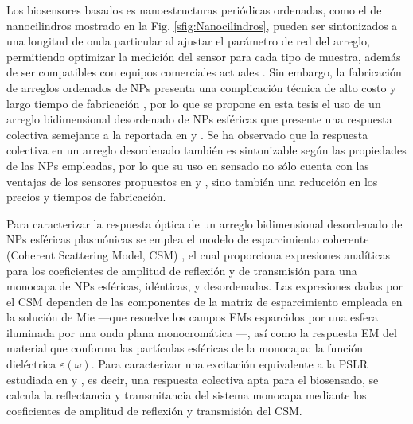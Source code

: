 Los biosensores basados es nanoestructuras periódicas ordenadas, como el de nanocilindros mostrado en la Fig. \ref{sfig:Nanocilindros}, pueden ser sintonizados a una longitud de onda particular al ajustar el parámetro de red del arreglo, permitiendo optimizar la medición del sensor para cada tipo de muestra, además de ser compatibles con equipos comerciales actuales \cite{kabashin2009plasmonic}.  Sin embargo, la fabricaci\'on de arreglos ordenados de NPs presenta una complicaci\'on t\'ecnica de alto costo y largo tiempo de fabricación \cite{estevez2014trends}, por lo que se propone en esta tesis el uso de un arreglo bidimensional desordenado de NPs esféricas que presente una respuesta colectiva semejante a la reportada en \cite{kabashin2009plasmonic} y \cite{danilov2018ultra}. Se ha observado que la respuesta colectiva en un arreglo desordenado también es sintonizable según las propiedades de las NPs empleadas, por lo que su uso en sensado no sólo cuenta con las ventajas de los sensores propuestos en \cite{kabashin2009plasmonic} y \cite{danilov2018ultra}, sino también una reducción en los precios y tiempos de fabricación. 

Para  caracterizar la respuesta óptica de un arreglo bidimensional desordenado de NPs esféricas plasmónicas se emplea el modelo de esparcimiento coherente (Coherent Scattering Model, CSM) \cite{reyes2018analytical}, el cual proporciona expresiones analíticas para los coeficientes de amplitud de reflexión y de transmisión para una monocapa de NPs esféricas, idénticas, y desordenadas.  Las expresiones  dadas por el CSM dependen de las componentes de la matriz de esparcimiento empleada en la solución de Mie ---que resuelve los campos EMs esparcidos por una esfera iluminada por una onda plana monocromática \cite{bohren1998absorption}---, así como la respuesta EM del material que conforma las partículas esféricas de la monocapa: la función dieléctrica $\varepsilon(\omega)$.  Para caracterizar una excitación equivalente a la PSLR estudiada en \cite{kabashin2009plasmonic} y \cite{danilov2018ultra}, es decir, una respuesta colectiva apta para el biosensado, se calcula la reflectancia y transmitancia del sistema monocapa mediante los coeficientes de amplitud de reflexión y transmisión del CSM. 
 
